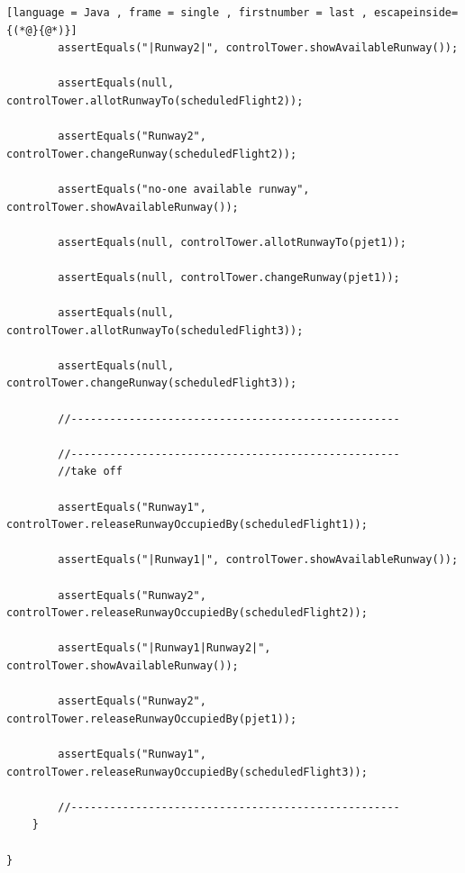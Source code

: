 \documentclass{article}
\begin{document}
\begin{sloppy}
\begin{lstlisting}[language = Java , frame = single , firstnumber = last , escapeinside={(*@}{@*)}]
		assertEquals("|Runway2|", controlTower.showAvailableRunway());
		
		assertEquals(null, controlTower.allotRunwayTo(scheduledFlight2));
		
		assertEquals("Runway2", controlTower.changeRunway(scheduledFlight2));
		
		assertEquals("no-one available runway", controlTower.showAvailableRunway());
		
		assertEquals(null, controlTower.allotRunwayTo(pjet1));
		
		assertEquals(null, controlTower.changeRunway(pjet1));
		
		assertEquals(null, controlTower.allotRunwayTo(scheduledFlight3));
		
		assertEquals(null, controlTower.changeRunway(scheduledFlight3));
		
		//---------------------------------------------------
		
		//---------------------------------------------------
		//take off
		
		assertEquals("Runway1", controlTower.releaseRunwayOccupiedBy(scheduledFlight1));
		
		assertEquals("|Runway1|", controlTower.showAvailableRunway());
		
		assertEquals("Runway2", controlTower.releaseRunwayOccupiedBy(scheduledFlight2));
		
		assertEquals("|Runway1|Runway2|", controlTower.showAvailableRunway());
		
		assertEquals("Runway2", controlTower.releaseRunwayOccupiedBy(pjet1));
		
		assertEquals("Runway1", controlTower.releaseRunwayOccupiedBy(scheduledFlight3));
		
		//---------------------------------------------------
	}

}



\end{lstlisting}




\end{sloppy}
\end{document}

